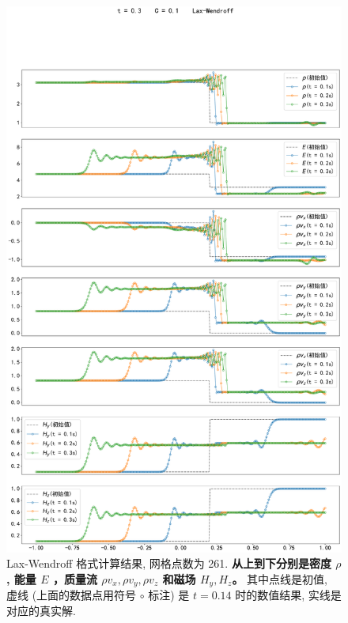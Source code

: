 \documentclass[10.5pt
]{article}
\begin{document}
\begin{figure}[htpb]
	\centering
	\includegraphics[width=\textwidth]{figures/init4.pdf}
	\caption{Lax-Wendroff 格式计算结果, 网格点数为 261. \textbf{从上到下分别是密度 $\rho$, 能量 $E$ ，质量流 $\rho v_x, \rho v_y, \rho v_z$ 和磁场 $H_y, H_z$。}
	其中点线是初值, 虚线 (上面的数据点用符号 $\circ$ 标注) 是 $t=0.14$ 时的数值结果, 实线是对应的真实解.}
	\label{fig:lax_wendroff4}
\end{figure}
\end{document}
